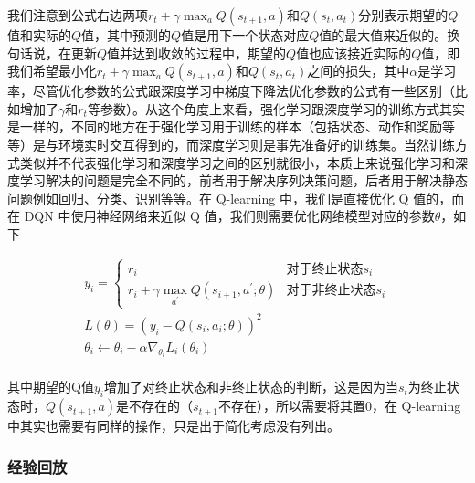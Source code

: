 我们注意到公式右边两项$r_t+\gamma\max _{a}Q(s_{t+1},a)$和$Q(s_t,a_t)$分别表示期望的$Q$值和实际的$Q$值，其中预测的$Q$值是用下一个状态对应$Q$值的最大值来近似的。换句话说，在更新$Q$值并达到收敛的过程中，期望的$Q$值也应该接近实际的$Q$值，即我们希望最小化$r_t+\gamma\max _{a}Q(s_{t+1},a)$和$Q(s_t,a_t)$之间的损失，其中$\alpha$是学习率，尽管优化参数的公式跟深度学习中梯度下降法优化参数的公式有一些区别（比如增加了$\gamma$和$r_t$等参数）。从这个角度上来看，强化学习跟深度学习的训练方式其实是一样的，不同的地方在于强化学习用于训练的样本（包括状态、动作和奖励等等）是与环境实时交互得到的，而深度学习则是事先准备好的训练集。当然训练方式类似并不代表强化学习和深度学习之间的区别就很小，本质上来说强化学习和深度学习解决的问题是完全不同的，前者用于解决序列决策问题，后者用于解决静态问题例如回归、分类、识别等等。在 Q-learning 中，我们是直接优化 Q 值的，而在 DQN 中使用神经网络来近似 Q 值，我们则需要优化网络模型对应的参数$\theta$，如下

\begin{equation}
    \begin{split}
    y_{i}= \begin{cases}r_{i} & \text {对于终止状态} s_{i} \\ r_{i}+\gamma \max _{a^{\prime}} Q\left(s_{i+1}, a^{\prime} ; \theta\right) & \text {对于非终止状态} s_{i}\end{cases}\\
    L(\theta)=\left(y_{i}-Q\left(s_{i}, a_{i} ; \theta\right)\right)^{2}\\
    \theta_i \leftarrow \theta_i - \alpha \nabla_{\theta_{i}} L_{i}\left(\theta_{i}\right)\\
\end{split}
\end{equation}

其中期望的Q值$y_{i}$增加了对终止状态和非终止状态的判断，这是因为当$s_t$为终止状态时，$Q(s_{t+1},a)$是不存在的（$s_{t+1}$不存在），所以需要将其置0，在 Q-learning 中其实也需要有同样的操作，只是出于简化考虑没有列出。

\subsubsection{经验回放}

